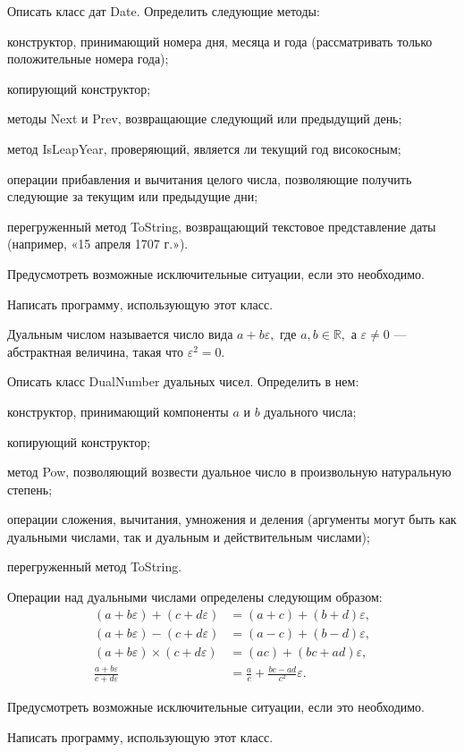 \task Описать класс дат Date. Определить следующие методы:
\begin{itemize*}
\item конструктор, принимающий номера дня, месяца и года
  (рассматривать только положительные номера года);
\item копирующий конструктор;
\item методы Next и Prev, возвращающие следующий или предыдущий день;
\item метод IsLeapYear, проверяющий, является ли текущий год
  високосным;
\item операции прибавления и вычитания целого числа, позволяющие
  получить следующие за текущим или предыдущие дни;
\item перегруженный метод ToString, возвращающий текстовое
  представление даты (например, «15 апреля 1707 г.»).
\end{itemize*}

Предусмотреть возможные исключительные ситуации, если это необходимо.

Написать программу, использующую этот класс.

\task Дуальным числом называется число вида $a+b\varepsilon,$ где $a,
b \in \mathbb{R},$ а $\varepsilon \neq 0$ — абстрактная величина,
такая что $\varepsilon^2 = 0$.

Описать класс DualNumber дуальных чисел. Определить в нем:
\begin{itemize*}
\item конструктор, принимающий компоненты $a$ и $b$ дуального числа;
\item копирующий конструктор;
\item метод Pow, позволяющий возвести дуальное число в произвольную
  натуральную степень;
\item операции сложения, вычитания, умножения и деления (аргументы
  могут быть как дуальными числами, так и дуальным и действительным
  числами);
\item перегруженный метод ToString.
\end{itemize*}

Операции над дуальными числами определены следующим образом:
\begin{align*}
  (a+b\varepsilon) + (c+d\varepsilon) &= (a+c) + (b+d)\varepsilon,\\
  (a+b\varepsilon) - (c+d\varepsilon) &= (a-c) + (b-d)\varepsilon,\\
  (a+b\varepsilon) \times (c+d\varepsilon) &= (ac) + (bc+ad)\varepsilon,\\
  \frac{a+b\varepsilon}{c+d\varepsilon} &=
  \frac{a}{c} + \frac{bc-ad}{c^2}\varepsilon.
\end{align*}

Предусмотреть возможные исключительные ситуации, если это необходимо.

Написать программу, использующую этот класс.
